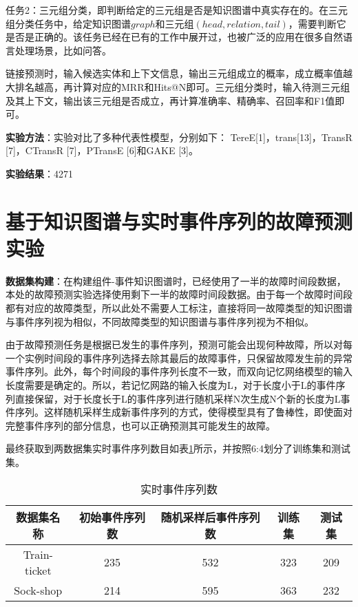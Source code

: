 任务2：三元组分类，即判断给定的三元组是否是知识图谱中真实存在的。在三元组分类任务中，给定知识图谱$graph$和三元组$(head,relation,tail)$，需要判断它是否是正确的。该任务已经在已有的工作\parencite{bordes2013translatingE,wang2014knowledge,lin2015learning}中展开过，也被广泛的应用在很多自然语言处理场景，比如问答。

链接预测时，输入候选实体和上下文信息，输出三元组成立的概率，成立概率值越大排名越高，再计算对应的MRR和Hits@N即可。三元组分类时，输入待测三元组及其上下文，输出该三元组是否成立，再计算准确率、精确率、召回率和F1值即可。


\textbf{实验方法}：实验对比了多种代表性模型，分别如下：
TereE[1]，trans[13]，TransR [7]，CTransR [7]，PTransE [6]和GAKE [3]。

\textbf{实验结果}：4271


\section{基于知识图谱与实时事件序列的故障预测实验}
\textbf{数据集构建}：在构建组件-事件知识图谱时，已经使用了一半的故障时间段数据，本处的故障预测实验选择使用剩下一半的故障时间段数据。由于每一个故障时间段都有对应的故障类型，所以此处不需要人工标注，直接将同一故障类型的知识图谱与事件序列视为相似，不同故障类型的知识图谱与事件序列视为不相似。

由于故障预测任务是根据已发生的事件序列，预测可能会出现何种故障，所以对每一个实例时间段的事件序列选择去除其最后的故障事件，只保留故障发生前的异常事件序列。此外，每个时间段的事件序列长度不一致，而双向记忆网络模型的输入长度需要是确定的。所以，若记忆网路的输入长度为L，对于长度小于L的事件序列直接保留，对于长度长于L的事件序列进行随机采样N次生成N个新的长度为L事件序列。这样随机采样生成新事件序列的方式，使得模型具有了鲁棒性，即使面对完整事件序列的部分信息，也可以正确预测其可能发生的故障。

最终获取到两数据集实时事件序列数目如表\ref{event-sequence-num}所示，并按照6:4划分了训练集和测试集。
\begin{table}[htbp]
    \centering
    \caption{实时事件序列数}
    \label{event-sequence-num}
    \begin{tabular}{ccccc}
        \hline
        数据集名称        & 初始事件序列数 & 随机采样后事件序列数 & 训练集 & 测试集 \\ \hline
        Train-ticket & 235     & 532     & 323 & 209 \\
        Sock-shop    & 214     & 595     & 363 & 232 \\ \hline
    \end{tabular}
\end{table}

